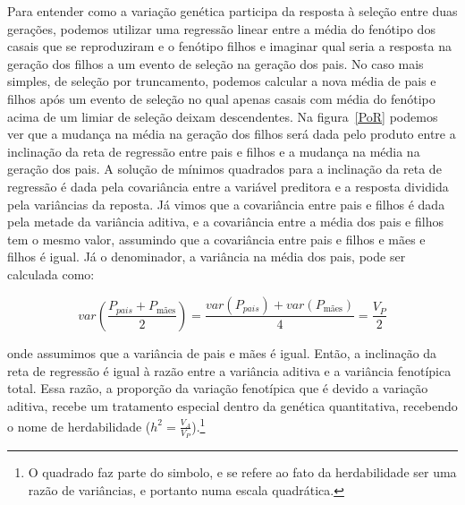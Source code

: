 \begin{refsection}
Para entender como a variação genética participa da resposta à seleção entre
duas gerações, podemos utilizar uma regressão linear entre a média do fenótipo
dos casais que se reproduziram e o fenótipo filhos e imaginar qual seria a
resposta na geração dos filhos a um evento de seleção na geração dos pais. No
caso mais simples, de seleção por truncamento, podemos calcular a nova média
de pais e filhos após um evento de seleção no qual apenas casais com média do
fenótipo acima de um limiar de seleção deixam descendentes. Na
figura~\ref{PoR} podemos ver que a mudança na média na geração dos filhos será
dada pelo produto entre a inclinação da reta de regressão entre pais e filhos
e a mudança na média na geração dos pais. A solução de mínimos quadrados para
a inclinação da reta de regressão é dada pela covariância entre a variável
preditora e a resposta dividida pela variâncias da reposta. Já vimos que a
covariância entre pais e filhos é dada pela metade da variância aditiva, e a
covariância entre a média dos pais e filhos tem o mesmo valor, assumindo que a
covariância entre pais e filhos e mães e filhos é igual. Já o denominador, a
variância na média dos pais, pode ser calculada como:

\begin{equation}
var(\frac{P_{pais} + P_{\text{mães}}}{2}) = \frac{var(P_{pais}) + var(P_{\text{mães}})}{4} = \frac{V_P}{2}
\end{equation}

onde assumimos que a variância de pais e mães é igual. Então, a inclinação da
reta de regressão é igual à razão entre a variância aditiva e a variância
fenotípica total. Essa razão, a proporção da variação fenotípica que é devido
a variação aditiva, recebe um tratamento especial dentro da genética
quantitativa, recebendo o nome de herdabilidade ($h^2 =
\frac{V_A}{V_P}$).\footnote{O quadrado faz parte do simbolo, e se refere ao
fato da herdabilidade ser uma razão de variâncias, e portanto numa escala
quadrática.}


\end{refsection}
